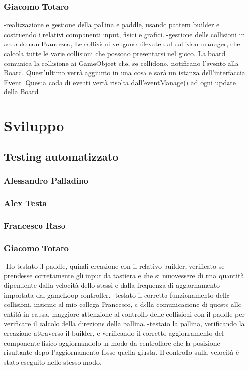 \documentclass[a4paper,12pt]{report}
\begin{document}
    
    \subsection*{Giacomo Totaro}
    -realizzazione e gestione della pallina e paddle, usando pattern builder e costruendo i relativi componenti input, fisici e grafici.
    -gestione delle collisioni in accordo con Francesco, Le collisioni vengono rilevate dal collision manager, che calcola tutte le varie collisioni che possono presentarsi nel gioco. La board comunica la collisione ai GameObjcet che, se collidono, notificano l'evento alla Board. Quest'ultimo verrà aggiunto in una cosa e sarà un istanza dell'interfaccia Event. Questa coda di eventi verrà risolta dall'eventManage() ad ogni update della Board
    

\chapter{Sviluppo}
\section{Testing automatizzato}
    \subsection*{Alessandro Palladino}
    
    
    \subsection*{Alex Testa}
    
    
    \subsection*{Francesco Raso}
    
    
    \subsection*{Giacomo Totaro}
    -Ho testato il paddle, quindi creazione con il relativo builder, verificato se prendesse corretamente gli input da tastiera e che si muovessere di una quantità dipendente dalla velocità dello stessi e dalla frequenza di aggiornamento importata dal gameLoop controller.
    -testato il corretto funzionamento delle collisioni, insieme al mio collega Francesco, e della comunicazione di queste alle entità in causa. maggiore attenzione al controllo delle collisioni con il paddle per verificare il calcolo della direzione della pallina.
    -testato la pallina, verificando la creazione attraverso il builder, e verificando il corretto aggionramento del componente fisico aggiornandolo in modo da controllare che la posizione risultante dopo l'aggiornamento fosse quella giusta. Il controllo sulla velocità è stato eseguito nello stesso modo.
    
\end{document}
